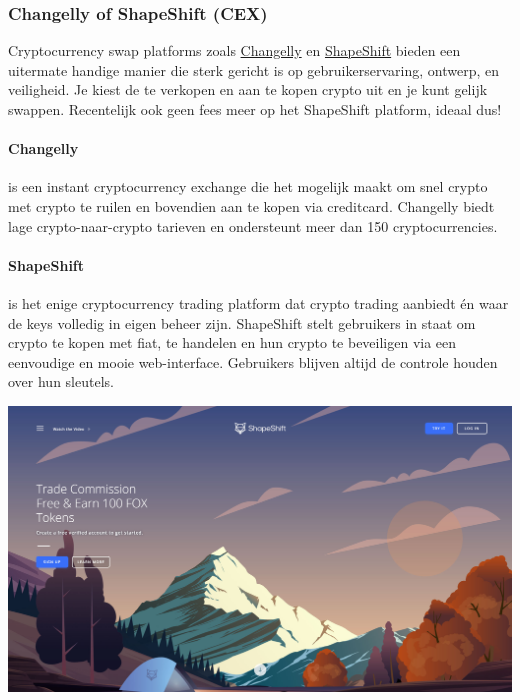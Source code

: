 \subsubsection*{Changelly of ShapeShift (CEX)}
Cryptocurrency swap platforms zoals \href{https://changelly.com/?ref_id=7tas7fubzklk9f74}{Changelly} en \href{https://shapeshift.com}{ShapeShift} bieden een uitermate handige manier die sterk gericht is op gebruikerservaring, ontwerp, en veiligheid. Je kiest de te verkopen en aan te kopen crypto uit en je kunt gelijk swappen. Recentelijk ook geen fees meer op het ShapeShift platform, ideaal dus! 

\paragraph{Changelly} is een instant cryptocurrency exchange die het mogelijk maakt om snel crypto met crypto te ruilen en bovendien aan te kopen via creditcard. Changelly biedt lage crypto-naar-crypto tarieven en ondersteunt meer dan 150 cryptocurrencies.

\paragraph{ShapeShift} is het enige cryptocurrency trading platform dat  crypto trading aanbiedt {\'e}n waar de keys volledig in eigen beheer zijn. ShapeShift stelt gebruikers in staat om crypto te kopen met fiat, te handelen en hun crypto te beveiligen via een eenvoudige en mooie web-interface. Gebruikers blijven altijd de controle houden over hun sleutels.\medskip

\begin{borderbox}
     \includegraphics[width=\textwidth]{img/ch-exchanges/ShapeShift.jpg}
\end{borderbox}


